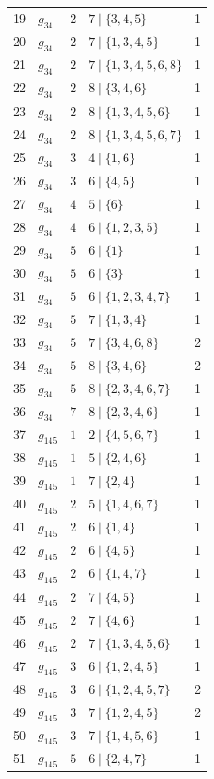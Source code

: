 \documentclass[11pt]{article}
\begin{document}
\begin{longtable}{rlllr}
19 & $g_{34}$ & $2$ & $7\mid \{3,4,5\}$ & 1 \\
20 & $g_{34}$ & $2$ & $7\mid \{1,3,4,5\}$ & 1 \\
21 & $g_{34}$ & $2$ & $7\mid \{1,3,4,5,6,8\}$ & 1 \\
22 & $g_{34}$ & $2$ & $8\mid \{3,4,6\}$ & 1 \\
23 & $g_{34}$ & $2$ & $8\mid \{1,3,4,5,6\}$ & 1 \\
24 & $g_{34}$ & $2$ & $8\mid \{1,3,4,5,6,7\}$ & 1 \\
25 & $g_{34}$ & $3$ & $4\mid \{1,6\}$ & 1 \\
26 & $g_{34}$ & $3$ & $6\mid \{4,5\}$ & 1 \\
27 & $g_{34}$ & $4$ & $5\mid \{6\}$ & 1 \\
28 & $g_{34}$ & $4$ & $6\mid \{1,2,3,5\}$ & 1 \\
29 & $g_{34}$ & $5$ & $6\mid \{1\}$ & 1 \\
30 & $g_{34}$ & $5$ & $6\mid \{3\}$ & 1 \\
31 & $g_{34}$ & $5$ & $6\mid \{1,2,3,4,7\}$ & 1 \\
32 & $g_{34}$ & $5$ & $7\mid \{1,3,4\}$ & 1 \\
33 & $g_{34}$ & $5$ & $7\mid \{3,4,6,8\}$ & 2 \\
34 & $g_{34}$ & $5$ & $8\mid \{3,4,6\}$ & 2 \\
35 & $g_{34}$ & $5$ & $8\mid \{2,3,4,6,7\}$ & 1 \\
36 & $g_{34}$ & $7$ & $8\mid \{2,3,4,6\}$ & 1 \\
37 & $g_{145}$ & $1$ & $2\mid \{4,5,6,7\}$ & 1 \\
38 & $g_{145}$ & $1$ & $5\mid \{2,4,6\}$ & 1 \\
39 & $g_{145}$ & $1$ & $7\mid \{2,4\}$ & 1 \\
40 & $g_{145}$ & $2$ & $5\mid \{1,4,6,7\}$ & 1 \\
41 & $g_{145}$ & $2$ & $6\mid \{1,4\}$ & 1 \\
42 & $g_{145}$ & $2$ & $6\mid \{4,5\}$ & 1 \\
43 & $g_{145}$ & $2$ & $6\mid \{1,4,7\}$ & 1 \\
44 & $g_{145}$ & $2$ & $7\mid \{4,5\}$ & 1 \\
45 & $g_{145}$ & $2$ & $7\mid \{4,6\}$ & 1 \\
46 & $g_{145}$ & $2$ & $7\mid \{1,3,4,5,6\}$ & 1 \\
47 & $g_{145}$ & $3$ & $6\mid \{1,2,4,5\}$ & 1 \\
48 & $g_{145}$ & $3$ & $6\mid \{1,2,4,5,7\}$ & 2 \\
49 & $g_{145}$ & $3$ & $7\mid \{1,2,4,5\}$ & 2 \\
50 & $g_{145}$ & $3$ & $7\mid \{1,4,5,6\}$ & 1 \\
51 & $g_{145}$ & $5$ & $6\mid \{2,4,7\}$ & 1 \\
\bottomrule\end{longtable}
\end{document}
